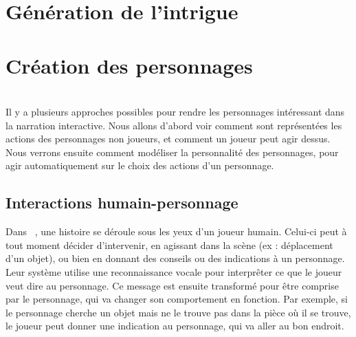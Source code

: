 \documentclass[asi]{picINSA}
\begin{document}
	
	\couverture{}

\tableofcontents{}

\chapter{Génération de l'intrigue}



\chapter{Création des personnages}
~\\
Il y a plusieurs approches possibles pour rendre les personnages intéressant dans la narration interactive. Nous allons d'abord voir comment sont représentées les actions des personnages non joueurs, et comment un joueur peut agir dessus. Nous verrons ensuite comment modéliser la personnalité des personnages, pour agir automatiquement sur le choix des actions d'un personnage.\\


\section{Interactions humain-personnage}

Dans ~\cite{IRIS:conf/aamas/CavazzaCM2002}, une histoire se déroule sous les yeux d'un joueur humain. Celui-ci peut à tout moment décider d'intervenir, en agissant dans la scène (ex : déplacement d'un objet), ou bien en donnant des conseils ou des indications à un personnage. Leur système utilise une reconnaissance vocale pour interprêter ce que le joueur veut dire au personnage. Ce message est ensuite transformé pour être comprise par le personnage, qui va changer son comportement en fonction. Par exemple, si le personnage cherche un objet mais ne le trouve pas dans la pièce où il se trouve, le joueur peut donner une indication au personnage, qui va aller au bon endroit.\\
\end{document}
